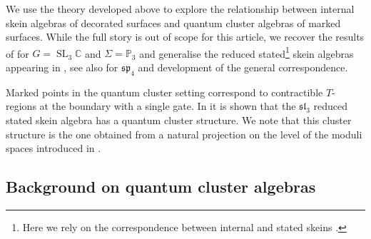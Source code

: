 \documentclass[a4paper]{article}
\numberwithin{equation}{section}
\newcommand{\1}{{\mathrm{1}\mkern-4mu{\mathchoice{}{}{\mskip-0.5mu}{\mskip-1mu}}\mathrm{l}}}
\newcommand{\CC}{\mathbb{C}}
\newcommand{\PP}{\mathbb{P}}
\DeclareMathOperator{\SL}{SL}
\begin{document}
We use the theory developed above to explore the relationship between internal skein algebras of decorated surfaces and quantum cluster algebras of marked surfaces.
While the full story is out of scope for this article, we recover the results of \cite{IY22} for $G = \SL_3\CC$ and $\Sigma = \PP_3$ and generalise the reduced stated\footnote{Here we rely on the correspondence between internal and stated skeins \cite{Haioun_2022}.} skein algebras appearing in \cite{IY22,Muller_2016}, see also \cite{Ishibashi_Yuasa_2025,Ishibashi_Kano_Yuasa_2025,Ishibashi_Oya_2026} for $\mathfrak{sp}_4$ and development of the general correspondence.

Marked points in the quantum cluster setting correspond to contractible $T$-regions at the boundary with a single gate. In \cite{IY22} it is shown that the $\mathfrak{sl}_3$ reduced stated skein algebra has a quantum cluster structure. We note that this cluster structure is the one obtained from a natural projection on the level of the moduli spaces introduced in \cite{FG06,Goncharov_Shen_2020}.



\subsection{Background on quantum cluster algebras}\label{sec:clusters-background}
\end{document}
